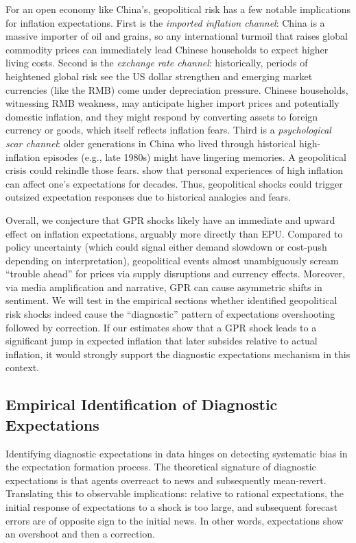 \documentclass[12pt]{article}
\begin{document}
For an open economy like China's, geopolitical risk has a few notable implications for inflation expectations. First is the \textit{imported inflation channel}: China is a massive importer of oil and grains, so any international turmoil that raises global commodity prices can immediately lead Chinese households to expect higher living costs. Second is the \textit{exchange rate channel}: historically, periods of heightened global risk see the US dollar strengthen and emerging market currencies (like the RMB) come under depreciation pressure. Chinese households, witnessing RMB weakness, may anticipate higher import prices and potentially domestic inflation, and they might respond by converting assets to foreign currency or goods, which itself reflects inflation fears. Third is a \textit{psychological scar channel}: older generations in China who lived through historical high-inflation episodes (e.g., late 1980s) might have lingering memories. A geopolitical crisis could rekindle those fears. \cite{Malmendier2016} show that personal experiences of high inflation can affect one's expectations for decades. Thus, geopolitical shocks could trigger outsized expectation responses due to historical analogies and fears.

Overall, we conjecture that GPR shocks likely have an immediate and upward effect on inflation expectations, arguably more directly than EPU. Compared to policy uncertainty (which could signal either demand slowdown or cost-push depending on interpretation), geopolitical events almost unambiguously scream “trouble ahead” for prices via supply disruptions and currency effects. Moreover, via media amplification and narrative, GPR can cause asymmetric shifts in sentiment. We will test in the empirical sections whether identified geopolitical risk shocks indeed cause the “diagnostic” pattern of expectations overshooting followed by correction. If our estimates show that a GPR shock leads to a significant jump in expected inflation that later subsides relative to actual inflation, it would strongly support the diagnostic expectations mechanism in this context.

\subsection{Empirical Identification of Diagnostic Expectations}
Identifying diagnostic expectations in data hinges on detecting systematic bias in the expectation formation process. The theoretical signature of diagnostic expectations is that agents overreact to news and subsequently mean-revert. Translating this to observable implications: relative to rational expectations, the initial response of expectations to a shock is too large, and subsequent forecast errors are of opposite sign to the initial news. In other words, expectations show an overshoot and then a correction.
\end{document}
